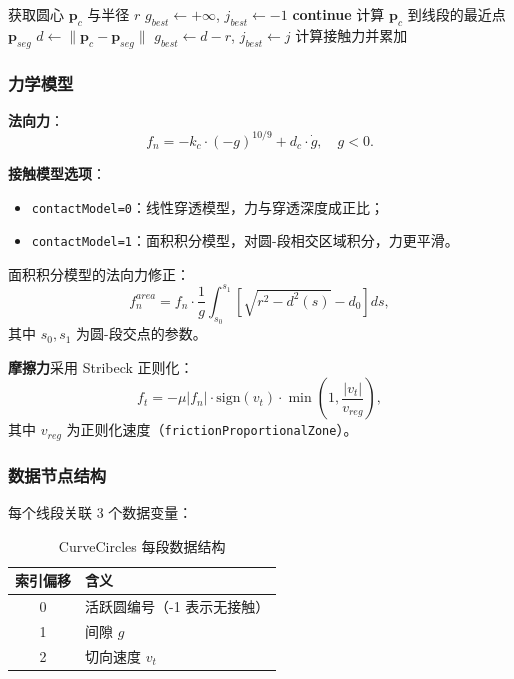 \documentclass[12pt]{ctexart}
\begin{document}
\begin{algorithm}[htbp]
\caption{CurveCircles 接触搜索}
\begin{algorithmic}[1]
  \State 获取圆心 $\mathbf{p}_c$ 与半径 $r$
  \State $g_{best} \gets +\infty$, $j_{best} \gets -1$
      \State \textbf{continue}
    \EndIf
    \State 计算 $\mathbf{p}_c$ 到线段的最近点 $\mathbf{p}_{seg}$
    \State $d \gets \|\mathbf{p}_c - \mathbf{p}_{seg}\|$
      \State $g_{best} \gets d - r$, $j_{best} \gets j$
    \EndIf
  \EndFor
    \State 计算接触力并累加
  \EndIf
\EndFor
\end{algorithmic}
\end{algorithm}

\subsubsection{力学模型}

\textbf{法向力}：
\begin{equation}
f_n = -k_c \cdot (-g)^{10/9} + d_c \cdot \dot{g}, \quad g < 0.
\end{equation}

\textbf{接触模型选项}：
\begin{itemize}
  \item \verb|contactModel=0|：线性穿透模型，力与穿透深度成正比；
  \item \verb|contactModel=1|：面积积分模型，对圆-段相交区域积分，力更平滑。
\end{itemize}

面积积分模型的法向力修正：
\begin{equation}
f_n^{area} = f_n \cdot \frac{1}{g} \int_{s_0}^{s_1} \left[ \sqrt{r^2 - d^2(s)} - d_0 \right] ds,
\end{equation}
其中 $s_0, s_1$ 为圆-段交点的参数。

\textbf{摩擦力}采用 Stribeck 正则化：
\begin{equation}
f_t = -\mu |f_n| \cdot \text{sign}(v_t) \cdot \min\left(1, \frac{|v_t|}{v_{reg}}\right),
\end{equation}
其中 $v_{reg}$ 为正则化速度（\verb|frictionProportionalZone|）。

\subsubsection{数据节点结构}

每个线段关联 3 个数据变量：
\begin{table}[htbp]
\centering
\small
\begin{tabular}{cl}
\toprule
索引偏移 & 含义 \\ 
\midrule
0 & 活跃圆编号（-1 表示无接触） \\ 
1 & 间隙 $g$ \\ 
2 & 切向速度 $v_t$ \\ 
\bottomrule
\end{tabular}
\caption{CurveCircles 每段数据结构}
\end{table}
\end{document}
